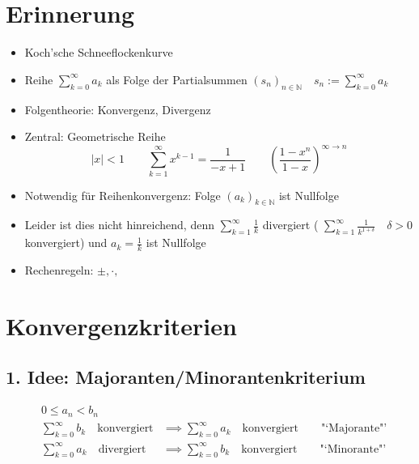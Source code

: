

\section{Erinnerung}
\begin{itemize}
	\item Koch'sche Schneeflockenkurve
	\item Reihe \( \sum_{k=0}^{\infty} a_k \) als Folge der Partialsummen \( (s_n)_{n \in \mathbb{N} } \quad s_n := \sum_{k=0}^{\infty}a_k \)
	\item Folgentheorie: Konvergenz, Divergenz
	\item Zentral: Geometrische Reihe \[
		|x|<1 \qquad \sum_{k=1}^{\infty} x^{k-1} = \frac{1}{-x+1} \qquad \left(\frac{1-x^n}{1-x}\right)^{\infty\rightarrow n}
	\]
	\item Notwendig für Reihenkonvergenz: Folge \( (a_k)_{k \in \mathbb{N}} \) ist Nullfolge
	\item Leider ist dies nicht hinreichend, denn \( \sum_{k=1}^{\infty} \frac{1}{k} \) divergiert ( \(\sum_{k=1}^{\infty}\frac{1}{k^{1+\delta}} \quad   \delta > 0 \) konvergiert) und \( a_k = \frac{1}{k} \) ist Nullfolge
	\item Rechenregeln: \( \pm, \cdot, \) 
\end{itemize}

\section{Konvergenzkriterien}
\subsection{1. Idee: Majoranten/Minorantenkriterium}
	
\begin{align*}
	& 0 \leq a_n < b_n & \\
	& \sum_{k=0}^{\infty}b_k \quad\text{konvergiert} &\implies \sum_{k=0}^{\infty} a_k \quad\text{konvergiert} \qquad \text{"`Majorante"'} \\
	& \sum_{k=0}^{\infty}a_k \quad\text{divergiert} &\implies \sum_{k=0}^{\infty} b_k \quad\text{konvergiert} \qquad \text{"`Minorante"'}
\end{align*}

